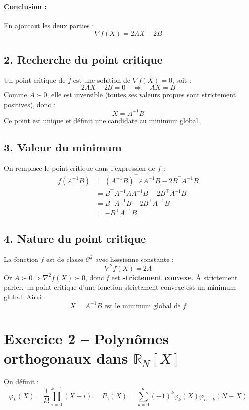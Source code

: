 \documentclass[a4paper,12pt]{article}
\begin{document}
\paragraph{\underline{Conclusion :}} En ajoutant les deux parties :
\[
\boxed{\nabla f(X) = 2AX - 2B}
\]

\subsection*{2. Recherche du point critique}
Un point critique de \( f \) est une solution de \( \nabla f(X) = 0 \), soit :
\[
2 A X - 2 B = 0 \quad \Rightarrow \quad A X = B
\]
Comme \( A \succ 0 \), elle est inversible (toutes ses valeurs propres sont strictement positives), donc :
\[
\boxed{X = A^{-1} B}
\]
Ce point est unique et d\'efinit une candidate au minimum global.

\subsection*{3. Valeur du minimum}
On remplace le point critique dans l'expression de \( f \) :
\begin{align*}
f(A^{-1}B) &= (A^{-1}B)^\top A A^{-1}B - 2B^\top A^{-1}B \\
&= B^\top A^{-1} A A^{-1} B - 2 B^\top A^{-1} B \\
&= B^\top A^{-1} B - 2 B^\top A^{-1} B \\
&= \boxed{- B^\top A^{-1} B}
\end{align*}

\subsection*{4. Nature du point critique}
La fonction \( f \) est de classe \( \mathcal{C}^2 \) avec hessienne constante :
\[
\nabla^2 f(X) = 2 A
\]
Or \( A \succ 0 \Rightarrow \nabla^2 f(X) \succ 0 \), donc \( f \) est \textbf{strictement convexe}.
\`A strictement parler, un point critique d'une fonction strictement convexe est un minimum global. Ainsi :
\[
\boxed{X = A^{-1} B \text{ est le minimum global de } f}
\]
\section*{Exercice 2 -- Polynômes orthogonaux dans \(\mathbb{R}_N[X]\)}

On définit :
\[
\varphi_k(X) = \frac{1}{k!} \prod_{i=0}^{k-1}(X - i), \quad
P_n(X) = \sum_{k=0}^n (-1)^k \varphi_k(X) \varphi_{n-k}(N - X)
\]
\end{document}
